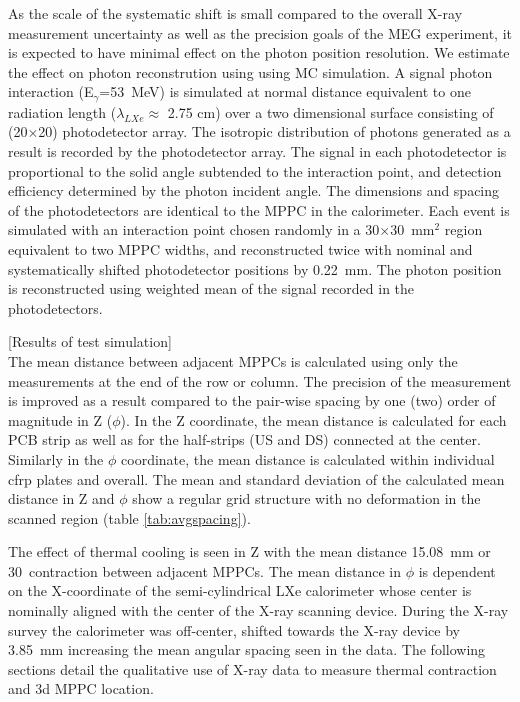 As the scale of the systematic shift is small compared to the
overall X-ray measurement uncertainty as well as the precision
goals of the MEG experiment, it is expected to 
have minimal effect on the photon position resolution.
We estimate the effect on photon reconstrution using
using MC simulation.
A signal photon
interaction (E$_\gamma$=53~MeV) 
is simulated at normal distance equivalent to 
one radiation length ($\lambda_{LXe}\approx$ 2.75 cm) 
over a two dimensional surface 
consisting of (20$\times$20) photodetector array. 
The isotropic distribution of photons generated as a result
is recorded by the photodetector array. The signal in each 
photodetector is proportional to the solid angle subtended to the
interaction point, and detection efficiency determined by the
photon incident angle.
The dimensions and spacing of the photodetectors are identical to
the MPPC in the calorimeter. Each event is simulated with
an interaction point chosen randomly in a 30$\times$30~mm$^2$
region equivalent to two MPPC widths, 
and reconstructed twice with nominal and systematically
shifted photodetector positions by 0.22~mm. 
The photon position is reconstructed using weighted mean 
of the signal recorded in the photodetectors.

[Results of test simulation]\\

The mean distance between adjacent MPPCs is calculated
using only the measurements at the 
end of the row or column.
The precision of the measurement is improved as a result compared to the
pair-wise spacing by  one (two) order of magnitude in Z ($\phi$).  In
the Z coordinate, the mean distance is calculated for each PCB strip
as well as for the half-strips (US and DS) connected at the center.
Similarly in the $\phi$ coordinate, the mean distance is calculated
within individual cfrp plates and overall.  The mean and standard
deviation of the calculated mean distance in Z and $\phi$  show a
regular grid structure with no deformation in the scanned region
(table \ref{tab:avgspacing}).

The effect of thermal cooling is seen in Z with the
mean distance 15.08~mm  or 30~\micron contraction between adjacent
MPPCs. The mean distance in $\phi$ is dependent on the X-coordinate of
the semi-cylindrical LXe calorimeter whose center is nominally aligned
with the center of the X-ray scanning device.  During the X-ray survey
the calorimeter was off-center, shifted towards the X-ray device by
3.85~mm increasing the mean angular spacing seen in the data.  The
following sections detail the qualitative use of X-ray data to measure
thermal contraction and 3d MPPC location.

